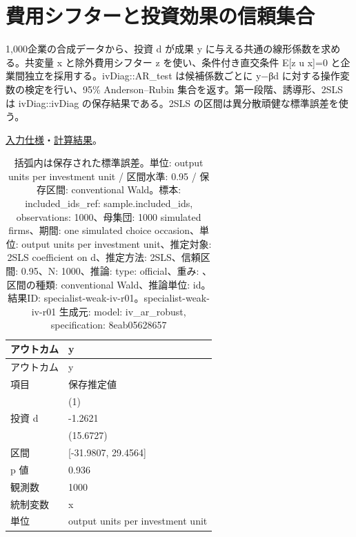 \documentclass[ecta,nameyear,draft]{econsocart}
\begin{document}
\begin{minipage}{\linewidth}

\section{費用シフターと投資効果の信頼集合}\label{result-3}

1,000企業の合成データから、投資 d が成果 y
に与える共通の線形係数を求める。共変量 x と除外費用シフター z
を使い、条件付き直交条件 E{[}z u \textbar{} x{]}=0
と企業間独立を採用する。ivDiag::AR\_test は候補係数ごとに y−βd
に対する操作変数の検定を行い、95\% Anderson--Rubin
集合を返す。第一段階、誘導形、2SLS は ivDiag::ivDiag
の保存結果である。2SLS の区間は異分散頑健な標準誤差を使う。

\href{https://github.com/yoshimurahiroki/econ-project-mini/blob/f9093ba87cabce7bee1fdf3391656544617a8cb9/examples/research-workspace/models/weak-iv-spec.json}{入力仕様}・\href{https://github.com/yoshimurahiroki/econ-project-mini/blob/f9093ba87cabce7bee1fdf3391656544617a8cb9/examples/research-workspace/models/weak-iv-result.json}{計算結果}。

\begin{longtable}[]{@{}ll@{}}
\caption{括弧内は保存された標準誤差。単位: output units per investment
unit / 区間水準: 0.95 / 保存区間: conventional Wald。標本:
included\_ids\_ref: sample.included\_ids, observations: 1000、母集団:
1000 simulated firms、期間: one simulated choice occasion、単位: output
units per investment unit、推定対象: 2SLS coefficient on d、推定方法:
2SLS、信頼区間: 0.95、N: 1000、推論: type: official、重み: 、区間の種類:
conventional Wald、推論単位: id。結果ID:
specialist-weak-iv-r01。specialist-weak-iv-r01 生成元: model:
iv\_ar\_robust, specification: 8eab05628657}\tabularnewline
\toprule\noalign{}
アウトカム & y \\
\midrule\noalign{}
\endfirsthead
\toprule\noalign{}
アウトカム & y \\
\midrule\noalign{}
\endhead
\bottomrule\noalign{}
\endlastfoot
項目 & 保存推定値 \\
& (1) \\
投資 d & -1.2621 \\
& (15.6727) \\
区間 & {[}-31.9807, 29.4564{]} \\
p 値 & 0.936 \\
観測数 & 1000 \\
統制変数 & x \\
単位 & output units per investment unit \\
\end{longtable}

\end{minipage}
\end{document}
